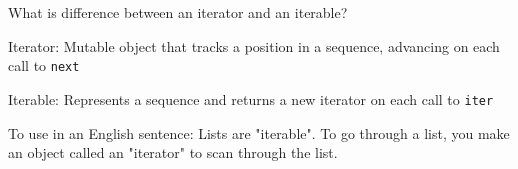 \begin{blocksection}
\question What is difference between an iterator and an iterable?

\begin{solution}[0.5in]
Iterator: Mutable object that tracks a position in a sequence, advancing on each call to \lstinline$next$

Iterable: Represents a sequence and returns a new iterator on each call to \lstinline$iter$

To use in an English sentence:
Lists are "iterable". To go through a list, you make an object called an "iterator" to scan through the list.
\end{solution}
\end{blocksection}
